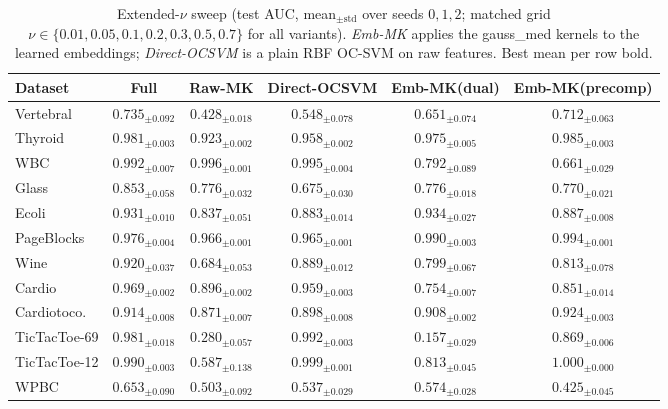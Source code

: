 \begin{table}[t]\centering
\caption{Extended-$\nu$ sweep (test AUC, mean$_{\pm\text{std}}$ over seeds $0,1,2$; matched grid $\nu\in\{0.01,0.05,0.1,0.2,0.3,0.5,0.7\}$ for all variants). \emph{Emb-MK} applies the gauss\_med kernels to the learned embeddings; \emph{Direct-OCSVM} is a plain RBF OC-SVM on raw features. Best mean per row bold.}
\label{tab:extnu}\small\setlength{\tabcolsep}{5pt}
\begin{tabular}{lccccc}\toprule
Dataset & Full & Raw-MK & Direct-OCSVM & Emb-MK(dual) & Emb-MK(precomp)\\
\midrule
Vertebral     & $\mathbf{0.735}_{\pm0.092}$ & $0.428_{\pm0.018}$ & $0.548_{\pm0.078}$ & $0.651_{\pm0.074}$ & $0.712_{\pm0.063}$ \\
Thyroid       & $0.981_{\pm0.003}$ & $0.923_{\pm0.002}$ & $0.958_{\pm0.002}$ & $0.975_{\pm0.005}$ & $\mathbf{0.985}_{\pm0.003}$ \\
WBC           & $0.992_{\pm0.007}$ & $\mathbf{0.996}_{\pm0.001}$ & $0.995_{\pm0.004}$ & $0.792_{\pm0.089}$ & $0.661_{\pm0.029}$ \\
Glass         & $\mathbf{0.853}_{\pm0.058}$ & $0.776_{\pm0.032}$ & $0.675_{\pm0.030}$ & $0.776_{\pm0.018}$ & $0.770_{\pm0.021}$ \\
Ecoli         & $0.931_{\pm0.010}$ & $0.837_{\pm0.051}$ & $0.883_{\pm0.014}$ & $\mathbf{0.934}_{\pm0.027}$ & $0.887_{\pm0.008}$ \\
PageBlocks    & $0.976_{\pm0.004}$ & $0.966_{\pm0.001}$ & $0.965_{\pm0.001}$ & $0.990_{\pm0.003}$ & $\mathbf{0.994}_{\pm0.001}$ \\
Wine          & $\mathbf{0.920}_{\pm0.037}$ & $0.684_{\pm0.053}$ & $0.889_{\pm0.012}$ & $0.799_{\pm0.067}$ & $0.813_{\pm0.078}$ \\
Cardio        & $\mathbf{0.969}_{\pm0.002}$ & $0.896_{\pm0.002}$ & $0.959_{\pm0.003}$ & $0.754_{\pm0.007}$ & $0.851_{\pm0.014}$ \\
Cardiotoco.   & $0.914_{\pm0.008}$ & $0.871_{\pm0.007}$ & $0.898_{\pm0.008}$ & $0.908_{\pm0.002}$ & $\mathbf{0.924}_{\pm0.003}$ \\
TicTacToe-69  & $0.981_{\pm0.018}$ & $0.280_{\pm0.057}$ & $\mathbf{0.992}_{\pm0.003}$ & $0.157_{\pm0.029}$ & $0.869_{\pm0.006}$ \\
TicTacToe-12  & $0.990_{\pm0.003}$ & $0.587_{\pm0.138}$ & $0.999_{\pm0.001}$ & $0.813_{\pm0.045}$ & $\mathbf{1.000}_{\pm0.000}$ \\
WPBC          & $\mathbf{0.653}_{\pm0.090}$ & $0.503_{\pm0.092}$ & $0.537_{\pm0.029}$ & $0.574_{\pm0.028}$ & $0.425_{\pm0.045}$ \\

\end{tabular}
\end{table}
